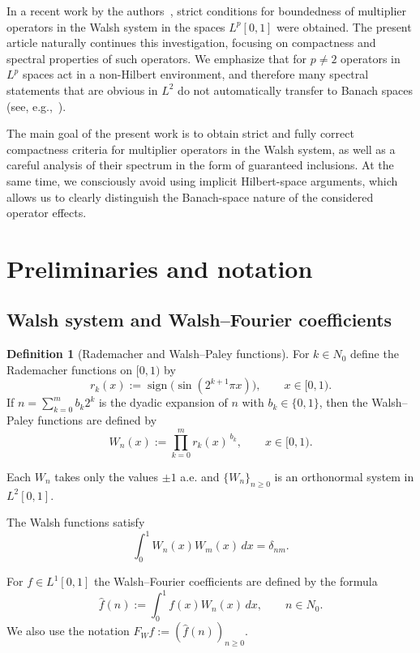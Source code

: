 \documentclass[a4paper,12pt]{article}
\theoremstyle{definition}
\newtheorem{definition}[theorem]{Definition}
\theoremstyle{remark}
\theoremstyle{definition}
\newcommand{\F}{\mathcal{F}_W}
\newcommand{\Nzero}{\mathbb{N}_0}
\def\mathbb#1{#1}%
\def\mathcal#1{#1}%
\begin{document}
In a recent work by the authors~\cite{BoundednessWalsh},
strict conditions for boundedness
of multiplier operators in the Walsh system
in the spaces $L^p[0,1]$ were obtained.
The present article naturally continues this investigation,
focusing on compactness and spectral properties of such operators.
We emphasize that for $p\neq2$
operators in $L^p$ spaces
act in a non-Hilbert environment,
and therefore many spectral statements
that are obvious in $L^2$
do not automatically transfer
to Banach spaces
(see, e.g.,~\cite{SteinHA,Conway,Fefferman1971}).

The main goal of the present work is to obtain
strict and fully correct compactness criteria
for multiplier operators in the Walsh system,
as well as a careful analysis of their spectrum
in the form of guaranteed inclusions.
At the same time, we consciously avoid
using implicit Hilbert-space arguments,
which allows us to clearly distinguish
the Banach-space nature
of the considered operator effects.

\section{Preliminaries and notation}
\label{sec:prelim}

\subsection{Walsh system and Walsh–Fourier coefficients}

\begin{definition}[Rademacher and Walsh--Paley functions]
For $k\in\mathbb{N}_0$ define the Rademacher functions on $[0,1)$ by
\[
r_k(x):=\operatorname{sign}\bigl(\sin(2^{k+1}\pi x)\bigr),
\qquad x\in[0,1).
\]
If $n=\sum_{k=0}^m b_k 2^k$ is the dyadic expansion of $n$ with $b_k\in\{0,1\}$,
then the Walsh--Paley functions are defined by
\[
W_n(x):=\prod_{k=0}^m r_k(x)^{\,b_k},\qquad x\in[0,1).
\]
\end{definition}
\noindent
Each $W_n$ takes only the values $\pm1$ a.e. and $\{W_n\}_{n\ge0}$ is an orthonormal system in $L^2[0,1]$.

The Walsh functions satisfy
\[
\int_0^1 W_n(x)W_m(x)\,dx = \delta_{nm}.
\]

For $f\in L^1[0,1]$ the Walsh–Fourier coefficients are defined by the formula
\[
\hat{f}(n) := \int_0^1 f(x)W_n(x)\,dx,\qquad n\in\Nzero.
\]
We also use the notation $\F f := (\hat{f}(n))_{n\ge 0}$.
\end{document}
